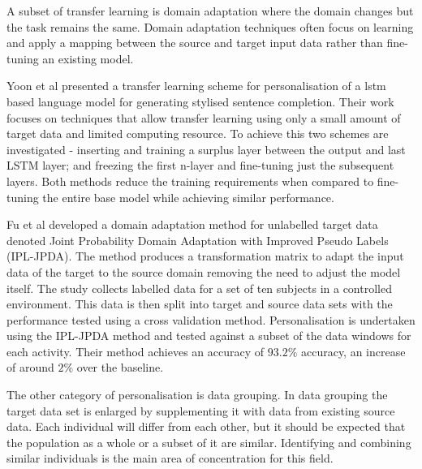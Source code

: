 A subset of transfer learning is domain adaptation where the domain changes but the task remains the same\cite{Goodfellow2015}. Domain adaptation techniques often focus on learning and apply a mapping between the source and target input data rather than fine-tuning an existing model.

Yoon et al presented a transfer learning scheme for personalisation of a \acrshort{lstm} based language model for generating stylised sentence completion. Their work focuses on techniques that allow transfer learning using only a small amount of target data and limited computing resource. To achieve this two schemes are investigated - inserting and training a surplus layer between the output and last LSTM layer; and freezing the first n-layer and fine-tuning just the subsequent layers. Both methods reduce the training requirements when compared to fine-tuning the entire base model while achieving similar performance.\cite{Yoon2017}

Fu et al developed a domain adaptation method for unlabelled target data denoted Joint Probability Domain Adaptation with Improved Pseudo Labels (IPL-JPDA). The method produces a transformation matrix to adapt the input data of the target to the source domain removing the need to adjust the model itself. The study collects labelled data for a set of ten subjects in a controlled environment. This data is then split into target and source data sets with the performance tested using a cross validation method. Personalisation is undertaken using the IPL-JPDA method and tested against a subset of the data windows for each activity. Their method achieves an accuracy of $93.2\%$ accuracy, an increase of around $2\%$ over the baseline.\cite{Fu2021}


The other category of personalisation is data grouping. In data grouping the target data set is enlarged by supplementing it with data from existing source data. Each individual will differ from each other, but it should be expected that the population as a whole or a subset of it are similar\cite{Schneider2021, Nguyen2021}. Identifying and combining similar individuals is the main area of concentration for this field.

